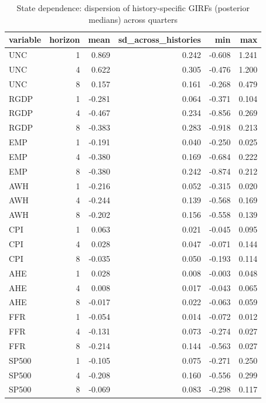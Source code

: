 \begin{table}[htbp]
\centering
\caption{State dependence: dispersion of history-specific GIRFs (posterior medians) across quarters}
\label{tab:state}
\begin{tabular}{lrrrrr}
\toprule
variable & horizon & mean & sd\_across\_histories & min & max \\
\midrule
UNC & 1 & 0.869 & 0.242 & -0.608 & 1.241 \\
UNC & 4 & 0.622 & 0.305 & -0.476 & 1.200 \\
UNC & 8 & 0.157 & 0.161 & -0.268 & 0.479 \\
RGDP & 1 & -0.281 & 0.064 & -0.371 & 0.104 \\
RGDP & 4 & -0.467 & 0.234 & -0.856 & 0.269 \\
RGDP & 8 & -0.383 & 0.283 & -0.918 & 0.213 \\
EMP & 1 & -0.191 & 0.040 & -0.250 & 0.025 \\
EMP & 4 & -0.380 & 0.169 & -0.684 & 0.222 \\
EMP & 8 & -0.380 & 0.242 & -0.874 & 0.212 \\
AWH & 1 & -0.216 & 0.052 & -0.315 & 0.020 \\
AWH & 4 & -0.244 & 0.139 & -0.568 & 0.169 \\
AWH & 8 & -0.202 & 0.156 & -0.558 & 0.139 \\
CPI & 1 & 0.063 & 0.021 & -0.045 & 0.095 \\
CPI & 4 & 0.028 & 0.047 & -0.071 & 0.144 \\
CPI & 8 & -0.035 & 0.050 & -0.193 & 0.114 \\
AHE & 1 & 0.028 & 0.008 & -0.003 & 0.048 \\
AHE & 4 & 0.008 & 0.017 & -0.043 & 0.065 \\
AHE & 8 & -0.017 & 0.022 & -0.063 & 0.059 \\
FFR & 1 & -0.054 & 0.014 & -0.072 & 0.012 \\
FFR & 4 & -0.131 & 0.073 & -0.274 & 0.027 \\
FFR & 8 & -0.214 & 0.144 & -0.563 & 0.027 \\
SP500 & 1 & -0.105 & 0.075 & -0.271 & 0.250 \\
SP500 & 4 & -0.208 & 0.160 & -0.556 & 0.299 \\
SP500 & 8 & -0.069 & 0.083 & -0.298 & 0.117 \\
\bottomrule
\end{tabular}
\end{table}